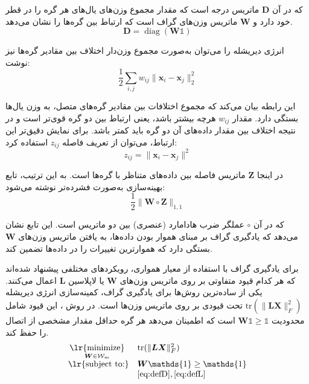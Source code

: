 \documentclass[10pt,twocolumn,a4paper]{article}
\newcommand\minimize[1]{\mathop{\text{\lr{minimize}}}\limits_{#1}\ }
\begin{document}
	که در آن \( \bm{D} \) ماتریس درجه است که مقدار مجموع وزن‌های یال‌های هر گره را در قطر خود دارد و \( \bm{W} \) ماتریس وزن‌های گراف است که ارتباط بین گره‌ها را نشان می‌دهد.
	\begin{equation}\label{eq:defD}
		\bm{D} = \operatorname{diag}(\bm{W}\mathds{1})
	\end{equation}
	
	انرژی دیریشله را می‌توان به‌صورت مجموع وزن‌دار اختلاف بین مقادیر گره‌ها نیز نوشت:
	\begin{equation}
		\frac{1}{2} \sum_{i,j} w_{ij} \|\bm{x}_i - \bm{x}_j\|_2^2
	\end{equation}
	
	این رابطه بیان می‌کند که مجموع اختلافات بین مقادیر گره‌های متصل، به وزن یال‌ها بستگی دارد. مقدار \( w_{ij} \) هرچه بیشتر باشد، یعنی ارتباط بین دو گره قوی‌تر است و در نتیجه اختلاف بین مقدار داده‌های آن دو گره باید کمتر باشد. برای نمایش دقیق‌تر این ارتباط، می‌توان از تعریف فاصله \( z_{ij} \) استفاده کرد:
	\begin{equation}
		z_{ij} = \|\bm{x}_i - \bm{x}_j\|^2
	\end{equation}
	
	در اینجا \( \bm{Z} \) ماتریس فاصله بین داده‌های متناظر با گره‌ها است. به این ترتیب، تابع بهینه‌سازی به‌صورت فشرده‌تر نوشته می‌شود:
	\begin{equation}
		\frac{1}{2} \| \bm{W} \circ \bm{Z} \|_{1,1}
	\end{equation}
	
	که در آن \( \circ \) عملگر ضرب هادامارد (عنصری) بین دو ماتریس است. این تابع نشان می‌دهد که یادگیری گراف بر مبنای هموار بودن داده‌ها، به یافتن ماتریس وزن‌های \( \bm{W} \) بستگی دارد که هموارترین تغییرات را در داده‌ها تضمین کند.
	
	برای یادگیری گراف با استفاده از معیار همواری، رویکردهای مختلفی پیشنهاد شده‌اند که هر کدام قیود متفاوتی بر روی ماتریس وزن‌های \( \bm{W} \) یا لاپلاسین \( \bm{L} \) اعمال می‌کنند. یکی از ساده‌ترین روش‌ها برای یادگیری گراف، کمینه‌سازی انرژی دیریشله \( \text{tr}(\|\bm{L} \bm{X}\|^2_F) \) تحت قیودی بر روی ماتریس وزن‌ها است.
	در روش \cite{Daitch2009}، این قیود شامل محدودیت \( \bm{W} \mathds{1} \geq \mathds{1} \) است که اطمینان می‌دهد هر گره حداقل مقدار مشخصی از اتصال را حفظ کند. 
	\begin{equation}
		\begin{array}{cl}
			\minimize{\bm{W}\in\mathcal{W}_m} & \text{tr}(\|\bm{L} \bm{X}\|^2_F) \\
			\text{\lr{subject to:}} & \bm{W} \mathds{1} \ge \mathds{1} \\
			& \eqref{eq:defD}, \eqref{eq:defL}
		\end{array}
	\end{equation}
	
\end{document}
